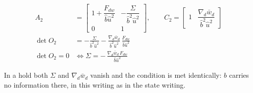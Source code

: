 \documentclass[11pt,a4paper,fontset=none]{ctexart}
\newcommand{\bw}{\bar{w}}
\begin{document}
\begin{align*}
A_2 &= \begin{bmatrix}
  1 + \dfrac{F_{dw}}{\hat{b}\hat{u}^{2}}
  & -\dfrac{\Sigma}{\hat{b}^{2}\hat{u}^{2}} \\[0.9em]
  0 & 1
\end{bmatrix} ,
\qquad
C_2 = \begin{bmatrix} 1 & \dfrac{\nabla_d\bw_d}{\hat{b}^{2}\hat{u}^{2}} \end{bmatrix} \\[0.8em]
\det O_2 &= -\frac{\Sigma}{\hat{b}^{2}\hat{u}^{2}}
  - \frac{\nabla_d\bw_d}{\hat{b}^{2}\hat{u}^{2}}\,
    \frac{F_{dw}}{\hat{b}\hat{u}^{2}} \\[0.4em]
\det O_2 = 0 &\iff
  \Sigma = -\,\frac{\nabla_d\bw_d\,F_{dw}}{\hat{b}\hat{u}^{2}}
\end{align*}

In a hold both $\Sigma$ and $\nabla_d\bw_d$ vanish and the condition is met
identically: $b$ carries no information there, in this writing as in the
state writing.
\end{document}

